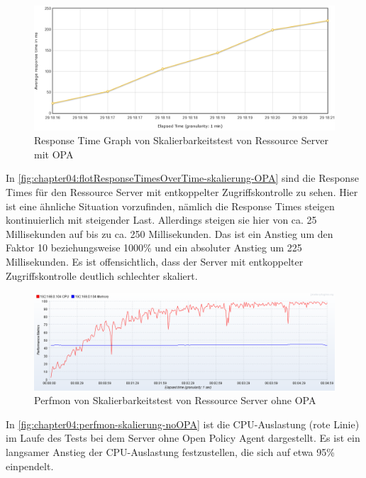\begin{figure}[H]
  \centering
  \includegraphics[width=1.0\textwidth]{gfx/flotResponseTimesOverTime-skalierung-opa.png}
  \caption{Response Time Graph von Skalierbarkeitstest von Ressource Server mit OPA}
  \label{fig:chapter04:flotResponseTimesOverTime-skalierung-OPA}
\end{figure}

In \autoref{fig:chapter04:flotResponseTimesOverTime-skalierung-OPA} sind die Response Times für den Ressource Server mit entkoppelter Zugriffskontrolle zu sehen. Hier ist eine ähnliche Situation vorzufinden, nämlich die Response Times steigen kontinuierlich mit steigender Last. Allerdings steigen sie hier von ca. 25 Millisekunden auf bis zu ca. 250 Millisekunden. Das ist ein Anstieg um den Faktor 10 beziehungsweise 1000\% und ein absoluter Anstieg um 225 Millisekunden. Es ist offensichtlich, dass der Server mit entkoppelter Zugriffskontrolle deutlich schlechter skaliert. 

\begin{figure}[H]
  \centering
  \includegraphics[width=1.0\textwidth]{gfx/perfmon-skalierung-noOPA.png}
  \caption{Perfmon von Skalierbarkeitstest von Ressource Server ohne OPA}
  \label{fig:chapter04:perfmon-skalierung-noOPA}
\end{figure}

In \autoref{fig:chapter04:perfmon-skalierung-noOPA} ist die CPU-Auslastung (rote Linie) im Laufe des Tests bei dem Server ohne Open Policy Agent dargestellt. Es ist ein langsamer Anstieg der CPU-Auslastung festzustellen, die sich auf etwa 95\% einpendelt. 

